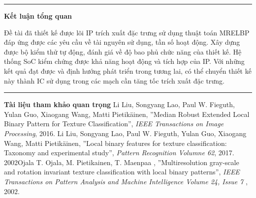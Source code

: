 \noindent\rule{\linewidth}{0.5pt} %

\vspace{0.5em} %
\noindent\textbf{\hspace{0.5em} Kết luận tổng quan}

Đề tài đã thiết kế được lõi IP trích xuất đặc trưng sử dụng thuật toán MRELBP đáp ứng được các yêu cầu về tài nguyên sử dụng, tần số hoạt động. Xây dựng được bộ kiểm thử tự động, đánh giá về độ bao phủ chức năng của thiết kế. Hệ thống SoC kiểm chứng được khả năng hoạt động và tích hợp của IP. Với những kết quả đạt được và định hướng phát triển trong tương lai, có thể chuyển thiết kế này thành IC sử dụng trong các mạch cần tăng tốc trích xuất đặc trưng. 


\noindent\rule{\linewidth}{0.5pt} %

\vspace{0.5em} %
\noindent\textbf{\hspace{0.5em} Tài liệu tham khảo quan trọng}
Li Liu, Songyang Lao, Paul W. Fieguth, Yulan Guo, Xiaogang Wang, Matti Pietikäinen, ''Median Robust Extended Local Binary Pattern for Texture Classification'', {\em IEEE Transactions on Image Processing}, 2016.
Li Liu, Songyang Lao, Paul W. Fieguth, Yulan Guo, Xiaogang Wang, Matti Pietikäinen, ''Local binary features for texture classification: Taxonomy and experimental study'', {\em Pattern Recognition Volumne 62}, 2017.
{2002}{Ojala}
T. Ojala, M. Pietikainen, T. Maenpaa
, ''Multiresolution gray-scale and rotation invariant texture classification with local binary patterns'', {\em  IEEE Transactions on Pattern Analysis and Machine Intelligence Volume 24, Issue 7 }, 2002.